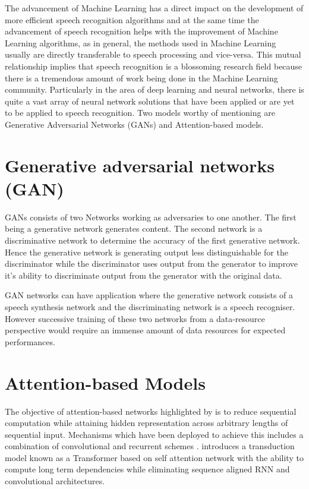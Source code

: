 The advancement of Machine Learning has a direct impact on the development of more efficient speech recognition algorithms and at the same time the advancement of speech recognition helps with the improvement of Machine Learning algorithms, as in general, the methods used in Machine Learning usually are directly transferable to speech processing and vice-versa.  This mutual relationship implies that speech recognition is a blossoming research field because there is a tremendous amount of work being done in the Machine Learning community.   Particularly in the area of deep learning and neural networks, there is quite a vast array of neural network solutions that have been applied or are yet to be applied to speech recognition.  Two models worthy of mentioning are Generative Adversarial Networks (GANs) and Attention-based models. 


\section{Generative adversarial networks (GAN)}

GANs consists of two Networks working as adversaries to one another.  The first being a generative network generates content.  The second network is a discriminative network to determine the accuracy of the first generative network.  Hence the generative network is generating output less distinguishable for the discriminator while the discriminator uses output from the generator to improve it’s ability to discriminate output from the generator with the original data.

GAN networks can have application where the generative network consists of a speech synthesis network and the discriminating network is  a speech recogniser.  However successive training of these two networks from a data-resource perspective would require an immense amount of data resources for expected performances. 

\section{Attention-based Models}

The objective of attention-based networks highlighted by  \cite{vaswani2017attention} is to reduce sequential computation while attaining hidden representation across arbitrary lengths of sequential input. Mechanisms which have been deployed to achieve this includes a combination of convolutional and recurrent schemes \cite{kaiser2016can,kalchbrenner2016neural, gehring2017convolutional}. \cite{vaswani2017attention} introduces a transduction model known as a Transformer based on self attention network with the ability to compute long term dependencies while eliminating sequence aligned RNN and convolutional architectures.

